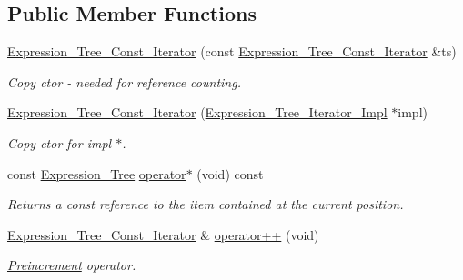\subsection*{Public Member Functions}
\begin{DoxyCompactItemize}
\item 
\hyperlink{classMadara_1_1Expression__Tree_1_1Expression__Tree__Const__Iterator_a7eb9b4caa92c9c9d5ab1d5d8400e713d}{Expression\_\-Tree\_\-Const\_\-Iterator} (const \hyperlink{classMadara_1_1Expression__Tree_1_1Expression__Tree__Const__Iterator}{Expression\_\-Tree\_\-Const\_\-Iterator} \&ts)
\begin{DoxyCompactList}\small\item\em Copy ctor -\/ needed for reference counting. \item\end{DoxyCompactList}\item 
\hyperlink{classMadara_1_1Expression__Tree_1_1Expression__Tree__Const__Iterator_ad3cc6928a011a3ce89314b507c06c4bd}{Expression\_\-Tree\_\-Const\_\-Iterator} (\hyperlink{classMadara_1_1Expression__Tree_1_1Expression__Tree__Iterator__Impl}{Expression\_\-Tree\_\-Iterator\_\-Impl} $\ast$impl)
\begin{DoxyCompactList}\small\item\em Copy ctor for impl $\ast$. \item\end{DoxyCompactList}\item 
const \hyperlink{classMadara_1_1Expression__Tree_1_1Expression__Tree}{Expression\_\-Tree} \hyperlink{classMadara_1_1Expression__Tree_1_1Expression__Tree__Const__Iterator_a7121d2cdd62e2db25a0277712cb4199e}{operator$\ast$} (void) const 
\begin{DoxyCompactList}\small\item\em Returns a const reference to the item contained at the current position. \item\end{DoxyCompactList}\item 
\hyperlink{classMadara_1_1Expression__Tree_1_1Expression__Tree__Const__Iterator}{Expression\_\-Tree\_\-Const\_\-Iterator} \& \hyperlink{classMadara_1_1Expression__Tree_1_1Expression__Tree__Const__Iterator_ad9b8fc4b459a79f95c0984960b641aba}{operator++} (void)
\begin{DoxyCompactList}\small\item\em \hyperlink{classMadara_1_1Expression__Tree_1_1Preincrement}{Preincrement} operator. \item\end{DoxyCompactList}\item 

\end{DoxyCompactItemize}
